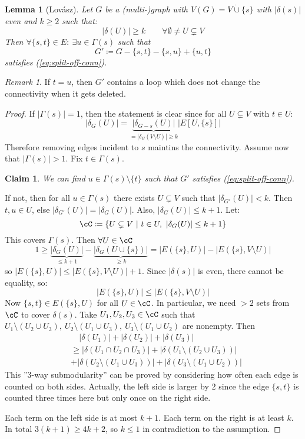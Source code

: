 \documentclass[11pt, a4paper]{article}
\newcommand{\abs}[1]{\left\lvert#1\right\rvert}
\newcommand{\set}[1]{\{#1\}}
\newtheorem{lemma}[theorem]{Lemma}
\newtheorem*{claim}{Claim}
\theoremstyle{remark}
\newtheorem*{uremark}{Remark}
\theoremstyle{definition}
\begin{document}
\begin{lemma}[Lovász]\label{lemma:splitting-off}
	Let $G$ be a (multi-)graph with $V(G)=V\dot\cup\set{s}$ with $\abs{\delta(s)}$
	even and $k\geq2$ such that:
	\begin{equation}\label{eq:split-off-conn}
		\abs{\delta(U)}\geq k \qquad\forall\emptyset \neq U\subsetneq V
	\end{equation}
	Then $\forall\set{s,t}\in E:\ \exists u\in\Gamma(s)$ such that
	\[G'\coloneqq G-\set{s,t}-\set{s,u}+\set{u,t}\]
	satisfies (\ref{eq:split-off-conn}).
\end{lemma}
\begin{uremark}
	If $t=u$, then $G'$ contains a loop which does not change the connectivity
	when it gets deleted.
\end{uremark}
\begin{proof}
	If $\abs{\Gamma(s)}=1$, then the statement is clear since for all $U\subsetneq
		V$ with $t\in U$:
	\[\abs{\delta_G(U)}=\underbrace{\abs{\delta_{G-s}(U)}}_{=\abs{\delta_G(V\setminus U)}\geq k}
		\abs{E[U,\set{s}]}\]
	Therefore removing edges incident to $s$ maintins the connectivity.
	Assume now that $\abs{\Gamma(s)}>1$. Fix $t\in\Gamma(s)$.
	\begin{claim}
		We can find $u\in\Gamma(s)\setminus\set{t}$ such that $G'$ satisfies
		(\ref{eq:split-off-conn}).
	\end{claim}
	If not, then for all $u\in\Gamma(s)$ there exists $U\subsetneq V$ such
	that $\abs{\delta_{G'}(U)}<k$. Then $t,u\in U$, else $\abs{\delta_{G'}(U)}
		=\abs{\delta_G(U)}$. Also, $\abs{\delta_G(U)}\leq k+1$. Let:
	\[\cC\coloneqq\set{U\subsetneq V\ |\ t\in U,\ \abs{\delta_G(U)}\leq k+1}\]
	This covers $\Gamma(s)$. Then $\forall U\in\cC$
	\[1\geq \underbrace{\abs{\delta_G(U)}}_{\leq k+1}
		-\underbrace{\abs{\delta_G(U\cup\set{s})}}_{\geq k}
		=\abs{E(\set{s}, U)}-\abs{E(\set{s}, V\setminus U)}\]
	so $\abs{E(\set{s}, U)}\leq \abs{E(\set{s}, V\setminus U)}+1$. Since
	$\abs{\delta(s)}$ is even, there cannot be equality, so:
	\[\abs{E(\set{s}, U)}\leq \abs{E(\set{s}, V\setminus U)}\]
	Now $\set{s,t}\in E(\set{s}, U)$ for all $U\in\cC$. In particular, we
	need $>2$ sets from $\cC$ to cover $\delta(s)$. Take
	$U_1,U_2,U_3\in\cC$ such that $U_1\setminus(U_2\cup U_3),\
		U_2\setminus(U_1\cup U_3),\ U_3 \setminus(U_1\cup U_2)$ are nonempty.
	Then
	\begin{align*}
		 & \quad\abs{\delta(U_1)}+\abs{\delta(U_2)}+\abs{\delta(U_3)}                       \\
		 & \geq \abs{\delta(U_1\cap U_2\cap U_3)}+\abs{\delta(U_1\setminus(U_2\cup U_3))}   \\
		 & +\abs{\delta(U_2\setminus(U_1\cup U_3))}+\abs{\delta(U_3\setminus(U_1\cup U_2))}
	\end{align*}
	This ''3-way submodularity'' can be proved by considering how
	often each edge is counted on both sides. Actually, the left
	side is larger by 2 since the edge $\set{s,t}$ is counted three
	times here but only once on the right side.

	Each term on the left side is at most $k+1$. Each term on the right
	is at least $k$. In total $3(k+1)\geq 4k+2$, so $k\leq 1$ in
	contradiction to the assumption.
\end{proof}
\end{document}
